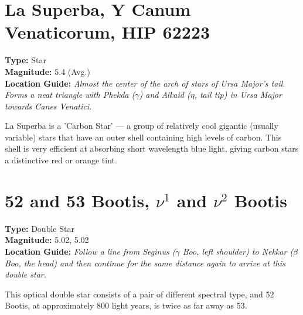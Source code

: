 \section{La Superba, Y Canum Venaticorum, HIP 62223}
\textbf{Type:} Star \\
\textbf{Magnitude:} 5.4 (Avg.) \\
\textbf{Location Guide:} \textit{Almost the center of the arch of stars of Ursa Major's tail. Forms a neat triangle with Phekda ($\gamma$) and Alkaid ($\eta$, tail tip) in Ursa Major towards Canes Venatici.} 

La Superba is a 'Carbon Star' --- a group of relatively cool gigantic
(usually variable) stars that have an outer shell containing high
levels of carbon. This shell is very efficient at absorbing short
wavelength blue light, giving carbon stars a distinctive red or orange
tint.

\section{52 and 53 Bootis, \texorpdfstring{$\nu^1$ and $\nu^2$}{nu1 and nu2} Bootis} 
\textbf{Type:} Double Star \\
\textbf{Magnitude:} 5.02, 5.02 \\
\textbf{Location Guide:} \textit{Follow a line from Seginus ($\gamma$ Boo, left shoulder) to Nekkar ($\beta$ Boo, the head) and then continue for the same distance again to arrive at this double star.} 

This optical double star consists of a pair of different spectral type, and 52 Bootis, at
approximately 800 light years, is twice as far away as 53.


